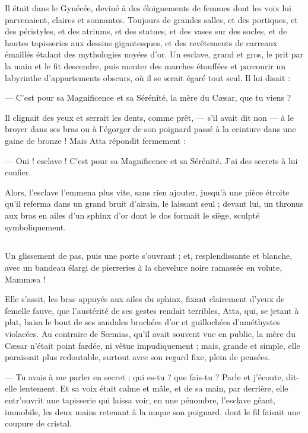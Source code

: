 \documentclass[a4paper, 11pt, oneside, polutonikogreek, french]{article}
\begin{document}
Il était dans le Gynécée, deviné à des éloignements de femmes dont les voix lui parvenaient, claires et sonnantes. Toujours de grandes salles, et des portiques, et des péristyles, et des atriums, et des statues, et des vases sur des socles, et de hautes tapisseries aux dessins gigantesques, et des revêtements de carreaux émaillés étalant des mythologies noyées d'or. Un esclave, grand et gros, le prit par la main et le fit descendre, puis monter des marches étouffées et parcourir un labyrinthe d'appartements obscurs, où il se serait égaré tout seul. Il lui disait :

--- C'est pour sa Magnificence et sa Sérénité, la mère du Cæsar, que tu viens ?

Il clignait des yeux et serrait les dents, comme prêt, --- s'il avait dit non --- à le broyer dans ses bras ou à l'égorger de son poignard passé à la ceinture dans une gaine de bronze ! Mais Atta répondit fermement :

--- Oui ! esclave ! C'est pour sa Magnificence et sa Sérénité. J'ai des secrets à lui confier.

Alors, l'esclave l'emmena plus vite, sans rien ajouter, jusqu'à une pièce étroite qu'il referma dans un grand bruit d'airain, le laissant seul ; devant lui, un thronus aux bras en ailes d'un sphinx d'or dont le dos formait le siège, sculpté symboliquement.
\clearpage
\subsection{}
\paragraph{}
Un glissement de pas, puis une porte s'ouvrant ; et, resplendissante et blanche, avec un bandeau élargi de pierreries à la chevelure noire ramassée en volute, Mammæa !

Elle s'assit, les bras appuyés aux ailes du sphinx, fixant clairement d'yeux de femelle fauve, que l'austérité de ses gestes rendait terribles, Atta, qui, se jetant à plat, baisa le bout de ses sandales brochées d'or et guillochées d'améthystes violacées. Au contraire de Sœmias, qu'il avait souvent vue en public, la mère du Cæsar n'était point fardée, ni vêtue impudiquement ; mais, grande et simple, elle paraissait plus redoutable, surtout avec son regard fixe, plein de pensées.

--- Tu avais à me parler en secret ; qui es-tu ? que fais-tu ? Parle et j'écoute, dit-elle lentement. Et sa voix était calme et mâle, et de sa main, par derrière, elle entr'ouvrit une tapisserie qui laissa voir, en une pénombre, l'esclave géant, immobile, les deux mains retenant à la nuque son poignard, dont le fil faisait une coupure de cristal.
\end{document}
